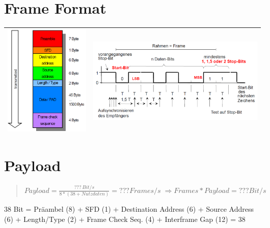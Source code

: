 \section*{Frame Format}

\begin{tabular}{|c|c|}
\hline 
\includegraphics[width=5cm]{part1/Frame} & \includegraphics[height=5cm]{part1/Frameuebertragung}\tabularnewline
\hline 
\end{tabular}


\section*{Payload}
\begin{verse}
$Payload=\frac{???\, Bit/s}{8*(38+Nutzdaten)}=???Frames/s\;\Rightarrow Frames*Payload=???Bit/s$
\end{verse}
38 Bit = Präambel (8) + SFD (1) + Destination Address (6) + Source
Address (6) + Length/Type (2) + Frame Check Seq. (4) + Interframe
Gap (12) = 38
